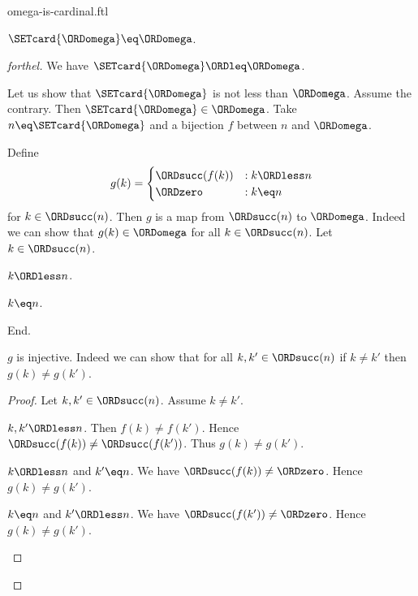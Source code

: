 \documentclass{naproche-library}
\begin{document}
\begin{smodule}[title=$\omega$ is a Cardinal Number]{omega-is-cardinal.ftl}

\begin{proposition}[forthel,id=SET_THEORY_07_4952029518626816]
  $\SETcard{\ORDomega} \eq \ORDomega$.
\end{proposition}
\begin{proof}[forthel]
  We have $\SETcard{\ORDomega} \ORDleq \ORDomega$.

  Let us show that $\SETcard{\ORDomega}$ is not less than $\ORDomega$.
    Assume the contrary.
    Then $\SETcard{\ORDomega} \in \ORDomega$.
    Take $n \eq \SETcard{\ORDomega}$ and a bijection $f$ between $n$ and $\ORDomega$.

    Define \[ g(k) =
      \begin{cases}
        \ORDsucc(f(k)) & : k \ORDless n
        \\
        \ORDzero           & : k \eq n
      \end{cases} \]
    for $k \in \ORDsucc(n)$.
    Then $g$ is a map from $\ORDsucc(n)$ to $\ORDomega$.
    Indeed we can show that $g(k) \in \ORDomega$ for all $k \in \ORDsucc(n)$.
      Let $k \in \ORDsucc(n)$.
      \begin{case}{$k \ORDless n$.} \end{case}
      \begin{case}{$k \eq n$.} \end{case}
    End.

    $g$ is injective.
    Indeed we can show that for all $k, k' \in \ORDsucc(n)$ if $k \neq k'$
    then $g(k) \neq g(k')$. 
    \begin{proof}
      Let $k, k' \in \ORDsucc(n)$.
      Assume $k \neq k'$.

      \begin{case}{$k, k' \ORDless n$.}
        Then $f(k) \neq f(k')$.
        Hence $\ORDsucc(f(k)) \neq \ORDsucc(f(k'))$.
        Thus $g(k) \neq g(k')$.
      \end{case}

      \begin{case}{$k \ORDless n$ and $k' \eq n$.}
        We have $\ORDsucc(f(k)) \neq \ORDzero$.
        Hence $g(k) \neq g(k')$.
      \end{case}

      \begin{case}{$k \eq n$ and $k' \ORDless n$.}
        We have $\ORDsucc(f(k')) \neq \ORDzero$.
        Hence $g(k) \neq g(k')$.
      \end{case}
    \end{proof}


\end{proof}
\end{smodule}
\end{document}
